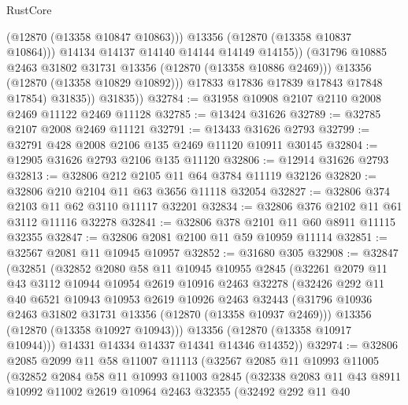\begin{lexlean}{RustCore}
\begin{coremodule}
                        (@12870 (@13358 @10847 @10863)))
                      @13356
                      (@12870 (@13358 @10837 @10864)))
                    @14134
                    @14137
                    @14140
                    @14144
                    @14149
                    @14155))
                (@31796 @10885 @2463 @31802 @31731 @13356 (@12870 (@13358 @10886 @2469)))
                @13356
                (@12870 (@13358 @10829 @10892)))
              @17833
              @17836
              @17839
              @17843
              @17848
              @17854)
            @31835))
        @31835))
@32784 := @31958 @10908 @2107 @2110 @2008 @2469 @11122 @2469 @11128
@32785 := @13424 @31626
@32789 := @32785 @2107 @2008 @2469 @11121
@32791 := @13433 @31626 @2793
@32799 := @32791 @428 @2008 @2106 @135 @2469 @11120 @10911 @30145
@32804 := @12905 @31626 @2793 @2106 @135 @11120
@32806 := @12914 @31626 @2793
@32813 := @32806 @212 @2105 @11 @64 @3784 @11119 @32126
@32820 := @32806 @210 @2104 @11 @63 @3656 @11118 @32054
@32827 := @32806 @374 @2103 @11 @62 @3110 @11117 @32201
@32834 := @32806 @376 @2102 @11 @61 @3112 @11116 @32278
@32841 := @32806 @378 @2101 @11 @60 @8911 @11115 @32355
@32847 := @32806 @2081 @2100 @11 @59 @10959 @11114
@32851 := @32567 @2081 @11 @10945 @10957
@32852 := @31680 @305
@32908 := @32847
    (@32851
      (@32852
        @2080
        @58
        @11
        @10945
        @10955
        @2845
        (@32261
          @2079
          @11
          @43
          @3112
          @10944
          @10954
          @2619
          @10916
          @2463
          @32278
          (@32426
            @292
            @11
            @40
            @6521
            @10943
            @10953
            @2619
            @10926
            @2463
            @32443
            (@31796 @10936 @2463 @31802 @31731 @13356 (@12870 (@13358 @10937 @2469)))
            @13356
            (@12870 (@13358 @10927 @10943)))
          @13356
          (@12870 (@13358 @10917 @10944)))
        @14331
        @14334
        @14337
        @14341
        @14346
        @14352))
@32974 := @32806
    @2085
    @2099
    @11
    @58
    @11007
    @11113
    (@32567
      @2085
      @11
      @10993
      @11005
      (@32852
        @2084
        @58
        @11
        @10993
        @11003
        @2845
        (@32338
          @2083
          @11
          @43
          @8911
          @10992
          @11002
          @2619
          @10964
          @2463
          @32355
          (@32492
            @292
            @11
            @40

\end{coremodule}
\end{lexlean}
